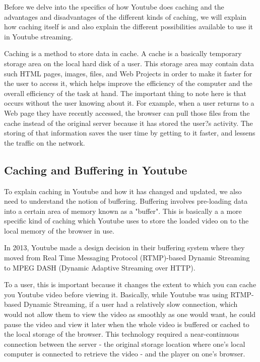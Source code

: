 Before we delve into the specifics of how Youtube does caching and the advantages and disadvantages of the different kinds of caching, we will explain how caching itself is and also explain the different possibilities available to use it in Youtube streaming.

Caching is a method to store data in cache. A cache is a basically temporary storage area on the local hard disk of a user. This storage area may contain data such HTML pages, images, files, and Web Projects in order to make it faster for the user to access it, which helps improve the efficiency of the computer and the overall efficiency of the task at hand. The important thing to note here is that occurs without the user knowing about it. For example, when a user returns to a Web page they have recently accessed, the browser can pull those files from the cache instead of the original server because it has stored the user?s activity. The storing of that information saves the user time by getting to it faster, and lessens the traffic on the network.


\subsection{Caching and Buffering in Youtube}
To explain caching in Youtube and how it has changed and updated, we also need to understand the notion of buffering. Buffering involves pre-loading data into a certain area of memory known as a "buffer". This is basically a a more specific kind of caching which Youtube uses to store the loaded video on to the local memory of the browser in use. 

In 2013, Youtube made a design decision in their buffering system where they moved from Real Time Messaging Protocol (RTMP)-based Dynamic Streaming to MPEG DASH (Dynamic Adaptive Streaming over HTTP). 

To a user, this is important because it changes the extent to which you can cache you Youtube video before viewing it. Basically, while Youtube was using RTMP-based Dynamic Streaming, if a user had a relatively slow connection, which would not allow them to view the video as smoothly as one would want, he could pause the video and view it later when the whole video is buffered or cached to the local storage of the browser. This technology required a near-continuous connection between the server - the original storage location where one's local computer is connected to retrieve the video - and the player on one's browser.

